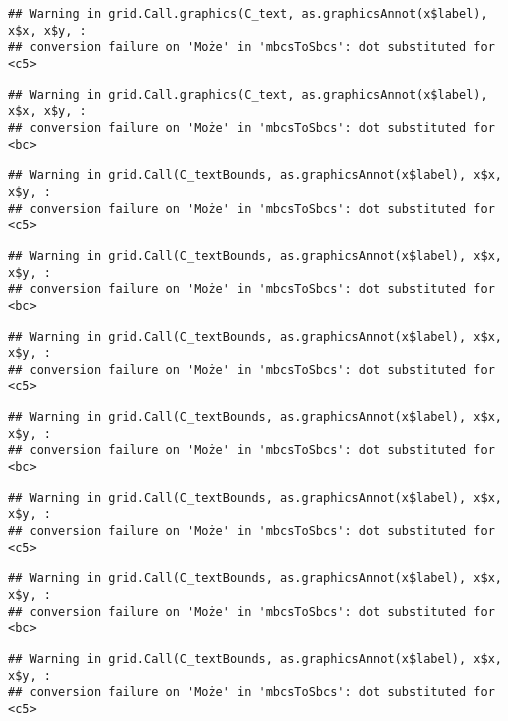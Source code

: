 \documentclass[
]{book}
\begin{document}
\begin{verbatim}
## Warning in grid.Call.graphics(C_text, as.graphicsAnnot(x$label), x$x, x$y, :
## conversion failure on 'Może' in 'mbcsToSbcs': dot substituted for <c5>
\end{verbatim}

\begin{verbatim}
## Warning in grid.Call.graphics(C_text, as.graphicsAnnot(x$label), x$x, x$y, :
## conversion failure on 'Może' in 'mbcsToSbcs': dot substituted for <bc>
\end{verbatim}

\begin{verbatim}
## Warning in grid.Call(C_textBounds, as.graphicsAnnot(x$label), x$x, x$y, :
## conversion failure on 'Może' in 'mbcsToSbcs': dot substituted for <c5>
\end{verbatim}

\begin{verbatim}
## Warning in grid.Call(C_textBounds, as.graphicsAnnot(x$label), x$x, x$y, :
## conversion failure on 'Może' in 'mbcsToSbcs': dot substituted for <bc>
\end{verbatim}

\begin{verbatim}
## Warning in grid.Call(C_textBounds, as.graphicsAnnot(x$label), x$x, x$y, :
## conversion failure on 'Może' in 'mbcsToSbcs': dot substituted for <c5>
\end{verbatim}

\begin{verbatim}
## Warning in grid.Call(C_textBounds, as.graphicsAnnot(x$label), x$x, x$y, :
## conversion failure on 'Może' in 'mbcsToSbcs': dot substituted for <bc>
\end{verbatim}

\begin{verbatim}
## Warning in grid.Call(C_textBounds, as.graphicsAnnot(x$label), x$x, x$y, :
## conversion failure on 'Może' in 'mbcsToSbcs': dot substituted for <c5>
\end{verbatim}

\begin{verbatim}
## Warning in grid.Call(C_textBounds, as.graphicsAnnot(x$label), x$x, x$y, :
## conversion failure on 'Może' in 'mbcsToSbcs': dot substituted for <bc>
\end{verbatim}

\begin{verbatim}
## Warning in grid.Call(C_textBounds, as.graphicsAnnot(x$label), x$x, x$y, :
## conversion failure on 'Może' in 'mbcsToSbcs': dot substituted for <c5>
\end{verbatim}
\end{document}
